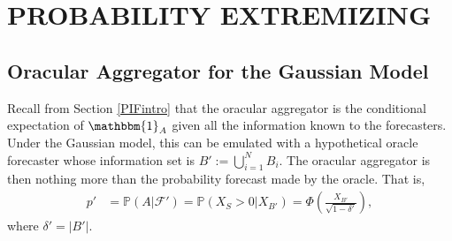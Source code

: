 \documentclass[12pt]{article}
\renewcommand{\P}{\mathbb{P}}
\theoremstyle{definition}
\theoremstyle{definition}
\def\one{\mathbbm{1}}
\def\P{{\mathbb P}}
\begin{document}
\section{PROBABILITY EXTREMIZING}
\label{extremizing}
\subsection{Oracular Aggregator for the Gaussian Model}
\label{oracular}
Recall from Section \ref{PIFintro} that the oracular aggregator is the
conditional expectation of $\one_A$ given all the information known to the
forecasters. Under the Gaussian model, this can be
emulated with a hypothetical oracle forecaster whose information set is
$B' := \bigcup_{i=1}^N B_i$.  
 The oracular aggregator is then nothing more than the probability forecast made by the oracle. That is,
 \begin{align*}
p' &= \P(A |  \mathcal{F}') = \P(X_S > 0 |  X_{B'}) = \Phi\left( \frac{X_{B'}}{\sqrt{1-\delta'}} \right),
\end{align*}
where $\delta' = |B'|$.
\end{document}
